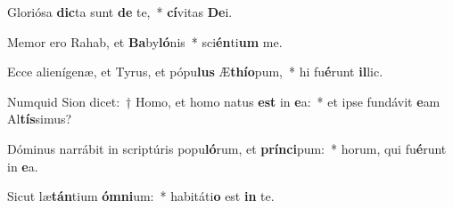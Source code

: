 \item Gloriósa \textbf{dic}ta sunt \textbf{de} te,~* \textbf{cí}vitas \textbf{De}i.
\item Memor ero Rahab, et \textbf{Ba}by\textbf{ló}nis~* sci\textbf{én}ti\textbf{um} me.
\item Ecce alienígenæ, et Tyrus, et pópu\textbf{lus} Æ\textbf{thí}\textbf{o}pum,~* hi fu\textbf{é}runt \textbf{il}lic.
\item Numquid Sion dicet:~† Homo, et homo natus \textbf{est} in \textbf{e}a:~* et ipse fundávit \textbf{e}am Al\textbf{tís}simus?
\item Dóminus narrábit in scriptúris popu\textbf{ló}rum, et \textbf{prín}\textbf{ci}pum:~* horum, qui fu\textbf{é}runt in \textbf{e}a.
\item Sicut læ\textbf{tán}tium \textbf{óm}\textbf{ni}um:~* habitáti\textbf{o} est \textbf{in} te.

